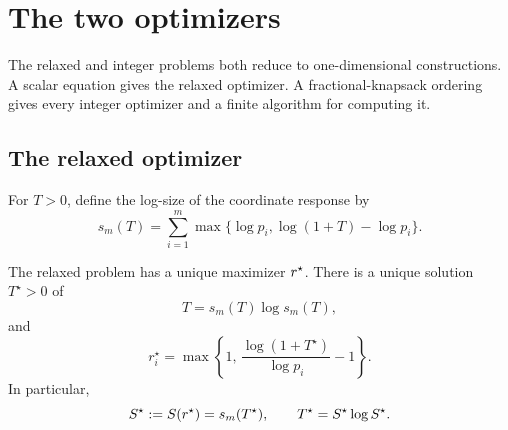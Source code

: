 \section{The two optimizers}
\label{s-optimizers}

The relaxed and integer problems both reduce to one-dimensional
constructions. A scalar equation gives the relaxed optimizer. A
fractional-knapsack ordering gives every integer optimizer and a finite
algorithm for computing it.

\subsection{The relaxed optimizer}
\label{s-relaxed-scalar}

For \(T>0\), define the log-size of the coordinate response by
\[
    s_m(T)
    =
    \sum_{i=1}^{m}
    \max\{\log p_i,\log(1+T)-\log p_i\}.
\]

\begin{proposition}
\label{prop-scalar-reduction}
The relaxed problem has a unique maximizer \(r^\star\). There is a unique
solution \(T^\star>0\) of
\[
    T=s_m(T)\log s_m(T),
\]
and
\begin{equation}
\label{e-relaxed-response}
    r_i^\star
    =
    \max\left\{
        1,\,
        \frac{\log(1+T^\star)}{\log p_i}-1
    \right\}.
\end{equation}
In particular,
\[
    S^\star:=S(r^\star)=s_m(T^\star),
    \qquad
    T^\star=S^\star\log S^\star.
\]
\end{proposition}

